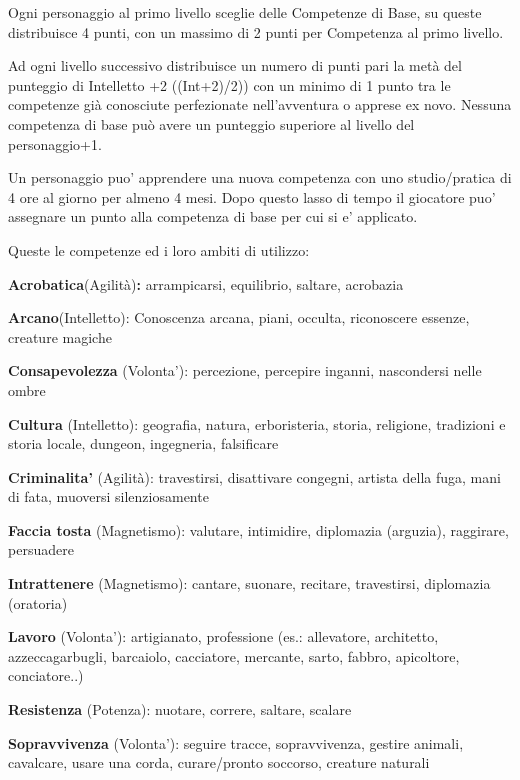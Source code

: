 \documentclass[a4paper,11pt,twoside,openany]{book}
\begin{document}
Ogni personaggio al primo livello sceglie delle Competenze di Base, su queste distribuisce 4 punti, con un massimo di 2 punti per Competenza al primo livello.

Ad ogni livello successivo distribuisce un numero di punti pari la metà del punteggio di Intelletto +2 ((Int+2)/2)) con un minimo di 1 punto tra le competenze già conosciute perfezionate nell'avventura o apprese ex novo. Nessuna competenza di base può avere un  punteggio superiore al livello del personaggio+1.

Un personaggio puo' apprendere una nuova competenza con uno studio/pratica di 4 ore al giorno per almeno 4 mesi. Dopo questo lasso di tempo il giocatore puo' assegnare un punto alla competenza di base per cui si e' applicato.

\bigskip

Queste le competenze ed i loro ambiti di utilizzo:

\textbf{Acrobatica}(Agilità)\textbf{:} arrampicarsi, equilibrio, saltare, acrobazia

\textbf{Arcano}(Intelletto): Conoscenza arcana, piani, occulta, riconoscere essenze, creature magiche

\textbf{Consapevolezza} (Volonta'): percezione, percepire inganni, nascondersi nelle ombre

\textbf{Cultura} (Intelletto): geografia, natura, erboristeria, storia, religione, tradizioni e storia locale, dungeon, ingegneria, falsificare

\textbf{Criminalita'} (Agilità): travestirsi, disattivare congegni, artista della fuga, mani di fata, muoversi silenziosamente

\textbf{Faccia tosta} (Magnetismo): valutare, intimidire, diplomazia (arguzia), raggirare, persuadere

\textbf{Intrattenere} (Magnetismo): cantare, suonare, recitare, travestirsi, diplomazia (oratoria)

\textbf{Lavoro} (Volonta'): artigianato, professione (es.: allevatore, architetto, azzeccagarbugli, barcaiolo, cacciatore, mercante, sarto, fabbro, apicoltore, conciatore..)

\textbf{Resistenza} (Potenza): nuotare, correre, saltare, scalare

\textbf{Sopravvivenza} (Volonta'): seguire tracce, sopravvivenza, gestire animali, cavalcare, usare una corda, curare/pronto soccorso, creature naturali
\end{document}
